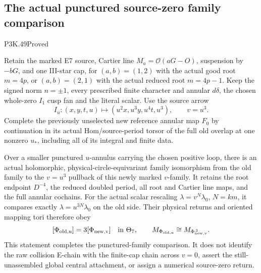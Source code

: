 \subsection{The actual punctured source-zero family comparison}
\begin{statement}{P3K.49}{Proved}

Retain the marked E7 source, Cartier line
\(M_a=\mathcal O(aG-O)\), suspension by \(-bG\), and one
III-star cap, for \((a,b)=(1,2)\) with the actual good root
\(m=4p\), or \((a,b)=(2,1)\) with the actual reduced root
\(m=4p-1\). Keep the signed norm \(n=\pm1\), every prescribed
finite character and annular \(d\delta\), the chosen whole-zero
\(I_1\) cusp fan and the literal scalar. Use the source arrow
\[
 I_u:(x,y,t,u)\longmapsto(u^2x,u^3y,u^4t,u^3),\qquad v=u^3.
\]
Complete the previously unselected new reference annular map
\(F_0\) by continuation in its actual Hom/source-period torsor
of the full old overlap at one nonzero \(u_*\), including all
of its integral and finite data.

Over a smaller punctured \(u\)-annulus carrying the chosen
positive loop, there is an actual holomorphic,
physical-circle-equivariant family isomorphism from the old
family to the \(v=u^3\) pullback of this newly marked
\(v\)-family. It retains the root endpoint \(D^{-4}\), the
reduced doubled period, all root and Cartier line maps, and
the full annular cochains. For the actual scalar rescaling
\(\lambda=v^N\lambda_0\), \(N=km\), it compares exactly
\(\lambda=u^{3N}\lambda_0\) on the old side. Their physical
returns and oriented mapping tori therefore obey
\[
 [\Phi_{\rm old,u}]=3[\Phi_{\rm new,v}]\quad\text{in }\Theta_7,
 \qquad M_{\Phi_{\rm old,u}}\cong M_{\Phi_{\rm new,v}^{\,3}}.
\]
This statement completes the punctured-family comparison. It
does not identify the raw collision E-chain with the finite-cap
chain across \(v=0\), assert the still-unassembled global
central attachment, or assign a numerical source-zero return.

\end{statement}
